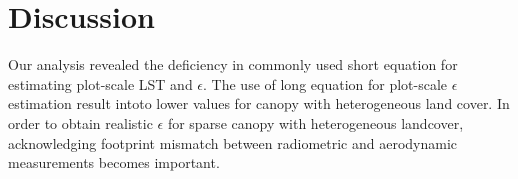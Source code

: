\documentclass[fleqn,10pt]{wlscirep}
\begin{document}
\section{Discussion}

Our analysis revealed the deficiency in commonly used short equation for estimating plot-scale LST and $\epsilon$. The use of long equation for plot-scale $\epsilon$ estimation result intoto lower values for canopy with heterogeneous land cover. In order to obtain realistic $\epsilon$ for sparse canopy with heterogeneous landcover, acknowledging footprint mismatch between radiometric and aerodynamic measurements becomes important.
\end{document}

